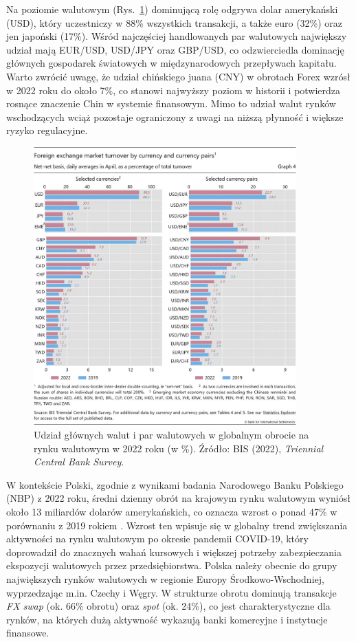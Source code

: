 Na poziomie walutowym (Rys.~\ref{fig:bis_pairs}) dominującą rolę odgrywa dolar amerykański (USD), który uczestniczy w 88\% wszystkich transakcji, 
a także euro (32\%) oraz jen japoński (17\%). Wśród najczęściej handlowanych par walutowych największy udział mają EUR/USD, USD/JPY oraz GBP/USD, 
co odzwierciedla dominację głównych gospodarek światowych w międzynarodowych przepływach kapitału. 
Warto zwrócić uwagę, że udział chińskiego juana (CNY) w obrotach Forex wzrósł w 2022 roku do około 7\%, co stanowi najwyższy poziom w historii i potwierdza rosnące znaczenie Chin w systemie finansowym. 
Mimo to udział walut rynków wschodzących wciąż pozostaje ograniczony z uwagi na niższą płynność i większe ryzyko regulacyjne.

\begin{figure}[h!]
  \centering
  \includegraphics[width=0.9\textwidth]{plots/bis_fx_turnover_pairs_2022.jpg}
  \caption{Udział głównych walut i par walutowych w globalnym obrocie na rynku walutowym w 2022 roku (w \%). Źródło: BIS (2022), \textit{Triennial Central Bank Survey}.}
  \label{fig:bis_pairs}
\end{figure}

W kontekście Polski, zgodnie z wynikami badania Narodowego Banku Polskiego (NBP) z 2022 roku, średni dzienny obrót na krajowym rynku walutowym wyniósł około 13 miliardów dolarów amerykańskich,
co oznacza wzrost o ponad 47\% w porównaniu z 2019 rokiem \parencite{nbp2022}. Wzrost ten wpisuje się w globalny trend zwiększania aktywności na rynku walutowym po okresie pandemii COVID-19, 
który doprowadził do znacznych wahań kursowych i większej potrzeby zabezpieczania ekspozycji walutowych przez przedsiębiorstwa. 
Polska należy obecnie do grupy największych rynków walutowych w regionie Europy Środkowo-Wschodniej, wyprzedzając m.in. Czechy i Węgry. 
W strukturze obrotu dominują transakcje \textit{FX swap} (ok. 66\% obrotu) oraz \textit{spot} (ok. 24\%), co jest charakterystyczne dla rynków, 
na których dużą aktywność wykazują banki komercyjne i instytucje finansowe.

